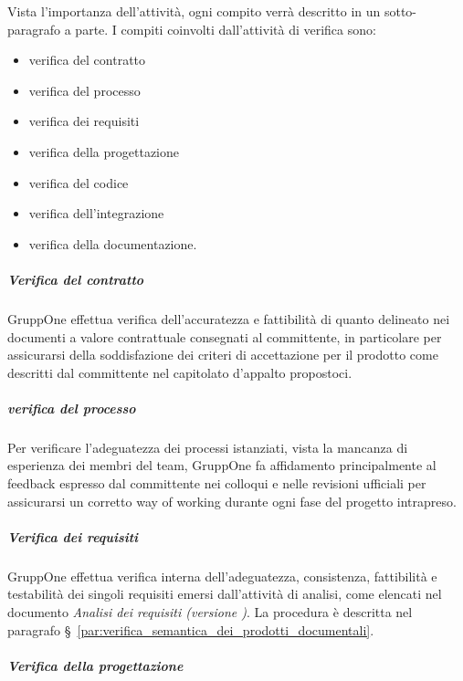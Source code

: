 \documentclass[../../norme-di-progetto.tex]{subfiles}
\begin{document}
Vista l'importanza dell'attività, ogni compito verrà descritto in un sotto-paragrafo a parte. I compiti coinvolti dall'attività di verifica sono:

\begin{itemize}
  \item verifica del contratto
  \item verifica del processo
  \item verifica dei requisiti
  \item verifica della progettazione
  \item verifica del codice
  \item verifica dell'integrazione
  \item verifica della documentazione.
\end{itemize}

\subparagraph{Verifica del contratto}%
\label{subp:verifica_del_contratto}

GruppOne effettua verifica dell'accuratezza e fattibilità di quanto delineato nei documenti a valore contrattuale consegnati al committente, in particolare per assicurarsi della soddisfazione dei criteri di accettazione per il prodotto come descritti dal committente nel capitolato d'appalto propostoci.


\subparagraph{verifica del processo}%
\label{subp:verifica_del_processo}

Per verificare l'adeguatezza dei processi istanziati, vista la mancanza di esperienza dei membri del team, GruppOne fa affidamento principalmente al feedback espresso dal committente nei colloqui e nelle revisioni ufficiali per assicurarsi un corretto way of working durante ogni fase del progetto intrapreso.


\subparagraph{Verifica dei requisiti}%
\label{subp:verifica_dei_requisiti}

GruppOne effettua verifica interna dell'adeguatezza, consistenza, fattibilità e testabilità dei singoli requisiti emersi dall'attività di analisi, come elencati nel documento \textit{Analisi dei requisiti (versione \versione)}.
La procedura è descritta nel paragrafo §~\ref{par:verifica_semantica_dei_prodotti_documentali}.


\subparagraph{Verifica della progettazione}%
\label{subp:verifica_della_progettazione}
\end{document}
